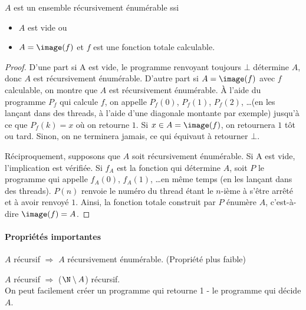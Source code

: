 \begin{myprop}
	$A$ est un ensemble récursivement énumérable ssi
    \begin{itemize}
      \item $A$ est vide ou
      \item $A = \image(f)$ et $f$ est une fonction totale calculable.
    \end{itemize}

    \begin{proof}
      D'une part si A est vide, le programme renvoyant toujours $\bot$ détermine $A$, donc $A$ est récursivement énumérable. 
      D'autre part si $A=\image(f)$ avec $f$ calculable, on montre que $A$ est récursivement énumérable. À l'aide du programme $P_f$ qui calcule $f$, 
      on appelle $P_f(0)$, $P_f(1)$, $P_f(2)$, \dots (en les lançant dans des threads, à l'aide d'une diagonale montante par exemple) 
      jusqu'à ce que $P_f(k) = x$ où on retourne $1$. Si $x \in A=\image(f)$, on retournera $1$ tôt ou tard. Sinon, on ne terminera jamais, 
      ce qui équivaut à retourner $\bot$.
      
      Réciproquement, supposons que $A$ soit récursivement énumérable. Si A est vide, l'implication est vérifiée. Si $f_A$ est la fonction 
      qui détermine $A$, soit $P$ le programme qui appelle $f_A(0)$, $f_A(1)$, \dots en même temps (en les lançant dans des threads). 
      $P(n)$ renvoie le numéro du thread étant le $n$-ième à s'être arrêté et à avoir renvoyé $1$. Ainsi, la fonction totale construit 
      par $P$ énumère $A$, c'est-à-dire $\image(f) =A$.
    \end{proof}
\end{myprop}


\paragraph{Propriétés importantes}
\label{par:propri_t_s_importantes}
\begin{myprop}
\label{prop:recursif_implique_recursivement_enumerable}
	$A$ récursif $\Rightarrow$ $A$ récursivement énumérable. (Propriété plus
		faible)
\end{myprop}

\begin{myprop}
	$A$ récursif $\Rightarrow$ ($\N \setminus A$) récursif.\\ On peut facilement créer
		un programme qui retourne 1 - le programme qui décide $A$.
\end{myprop}

